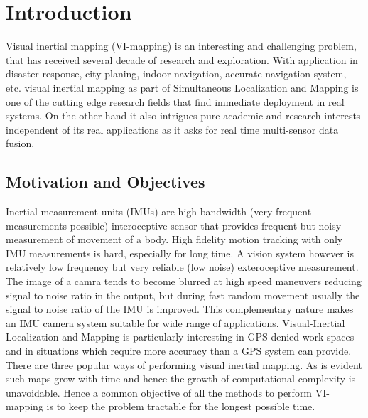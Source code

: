 \chapter{Introduction}
\label{sec:introduction}

Visual inertial mapping (VI-mapping) is an interesting and challenging problem, that has received several decade of research and exploration. With application in disaster response, city planing, indoor navigation, accurate navigation system, etc. visual inertial mapping as part of Simultaneous Localization and Mapping is one of the cutting edge research fields that find immediate deployment in real systems. On the other hand it also intrigues pure academic and research interests independent of its real applications as it asks for real time multi-sensor data fusion.

\section{Motivation and Objectives}
Inertial measurement units (IMUs) are high bandwidth (very frequent measurements possible) interoceptive sensor that provides frequent but noisy measurement of movement of a body. High fidelity motion tracking with only IMU measurements is hard, especially for long time. A vision system however is relatively low frequency but very reliable (low noise) exteroceptive measurement. The image of a camra tends to become blurred at high speed maneuvers reducing signal to noise ratio in the output, but during fast random movement usually the signal to noise ratio of the IMU is improved. This complementary nature makes an IMU camera system suitable for wide range of applications. Visual-Inertial Localization and Mapping is particularly interesting in GPS denied work-spaces and in situations which require more accuracy than a GPS system can provide. There are three popular ways of performing visual inertial mapping. As is evident such maps grow with time and hence the growth of computational complexity is unavoidable. Hence a common objective of all the methods to perform VI-mapping is to keep the problem tractable for the longest possible time.
